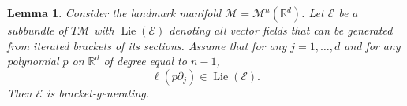 \documentclass[10pt]{amsart}
\newcounter{dummy} \numberwithin{dummy}{section}
\newtheorem{lemma}[dummy]{Lemma}
\theoremstyle{remark}
\DeclareMathOperator{\spn}{span}
\DeclareMathOperator{\SO}{SO}
\DeclareMathOperator{\Lie}{Lie}
\newcommand{\E}{\mathcal{E}}
\newcommand{\LM}{\mathcal{M}}
\numberwithin{equation}{section}
\begin{document}
\begin{lemma} \label{lemma:polynomials} Consider the landmark manifold $\LM = \LM^n(\mathbb{R}^d)$.
Let $\E$ be a subbundle of $T\LM$ with $\Lie(\E)$ denoting all vector fields that can be generated from iterated brackets of its sections. Assume that for any $j=1,\dots, d$ and for any polynomial $p$ on $\mathbb{R}^d$ of degree equal to $n-1$,
$$\ell (p \partial_j) \in \Lie(\E).$$
Then $\E$ is bracket-generating.
\end{lemma}
\end{document}
